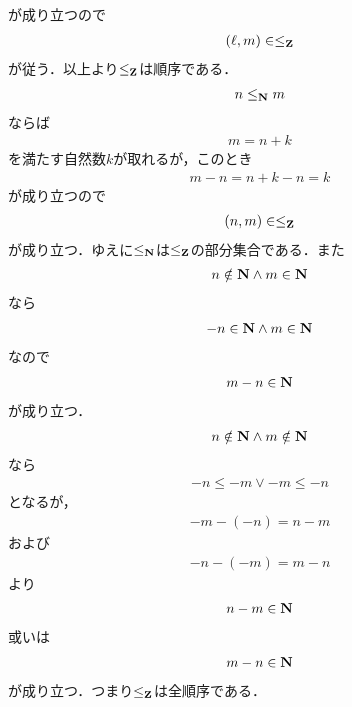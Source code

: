 	が成り立つので
	\begin{align}
		(\ell,m) \in \leq_{\mathbf{Z}}
	\end{align}
	が従う．以上より$\leq_{\mathbf{Z}}$は順序である．
	\begin{align}
		n \leq_{\mathbf{N}} m
	\end{align}
	ならば
	\begin{align}
		m = n + k
	\end{align}
	を満たす自然数$k$が取れるが，このとき
	\begin{align}
		m - n = n + k - n = k
	\end{align}
	が成り立つので
	\begin{align}
		(n,m) \in \leq_{\mathbf{Z}}
	\end{align}
	が成り立つ．ゆえに$\leq_{\mathbf{N}}$は$\leq_{\mathbf{Z}}$の部分集合である．また
	\begin{align}
		n \notin \mathbf{N} \wedge m \in \mathbf{N}
	\end{align}
	なら
	\begin{align}
		-n \in \mathbf{N} \wedge m \in \mathbf{N}
	\end{align}
	なので
	\begin{align}
		m - n \in \mathbf{N}
	\end{align}
	が成り立つ．
	\begin{align}
		n \notin \mathbf{N} \wedge m \notin \mathbf{N}
	\end{align}
	なら
	\begin{align}
		-n \leq -m \vee -m \leq -n
	\end{align}
	となるが，
	\begin{align}
		-m - (-n) = n - m
	\end{align}
	および
	\begin{align}
		-n - (-m) = m - n
	\end{align}
	より
	\begin{align}
		n - m \in \mathbf{N}
	\end{align}
	或いは
	\begin{align}
		m - n \in \mathbf{N}
	\end{align}
	が成り立つ．つまり$\leq_{\mathbf{Z}}$は全順序である．

